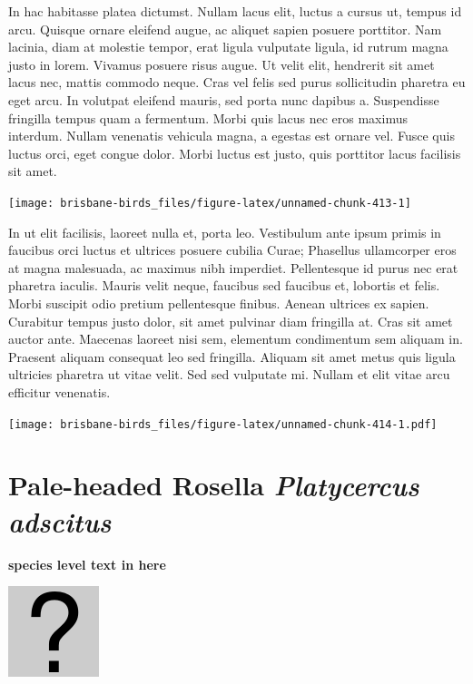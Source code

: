 \documentclass[]{book}
\let\origfigure\figure
\let\endorigfigure\endfigure
\renewenvironment{figure}[1][2] {
  \expandafter\origfigure\expandafter[H]
} {
  \endorigfigure
}
\begin{document}
In hac habitasse platea dictumst. Nullam lacus elit, luctus a cursus ut,
tempus id arcu. Quisque ornare eleifend augue, ac aliquet sapien posuere
porttitor. Nam lacinia, diam at molestie tempor, erat ligula vulputate
ligula, id rutrum magna justo in lorem. Vivamus posuere risus augue. Ut
velit elit, hendrerit sit amet lacus nec, mattis commodo neque. Cras vel
felis sed purus sollicitudin pharetra eu eget arcu. In volutpat eleifend
mauris, sed porta nunc dapibus a. Suspendisse fringilla tempus quam a
fermentum. Morbi quis lacus nec eros maximus interdum. Nullam venenatis
vehicula magna, a egestas est ornare vel. Fusce quis luctus orci, eget
congue dolor. Morbi luctus est justo, quis porttitor lacus facilisis sit
amet.

\begin{figure}
\texttt{[image: brisbane-birds\_files/figure-latex/unnamed-chunk-413-1]} \caption{insert figure caption}\label{fig:unnamed-chunk-413}
\end{figure}

In ut elit facilisis, laoreet nulla et, porta leo. Vestibulum ante ipsum
primis in faucibus orci luctus et ultrices posuere cubilia Curae;
Phasellus ullamcorper eros at magna malesuada, ac maximus nibh
imperdiet. Pellentesque id purus nec erat pharetra iaculis. Mauris velit
neque, faucibus sed faucibus et, lobortis et felis. Morbi suscipit odio
pretium pellentesque finibus. Aenean ultrices ex sapien. Curabitur
tempus justo dolor, sit amet pulvinar diam fringilla at. Cras sit amet
auctor ante. Maecenas laoreet nisi sem, elementum condimentum sem
aliquam in. Praesent aliquam consequat leo sed fringilla. Aliquam sit
amet metus quis ligula ultricies pharetra ut vitae velit. Sed sed
vulputate mi. Nullam et elit vitae arcu efficitur venenatis.

\begin{figure}
\centering
\texttt{[image: brisbane-birds\_files/figure-latex/unnamed-chunk-414-1.pdf]}
\caption{\label{fig:unnamed-chunk-414}insert figure caption}
\end{figure}

\section{\texorpdfstring{Pale-headed Rosella \emph{Platycercus
adscitus}}{Pale-headed Rosella Platycercus adscitus}}\label{pale-headed-rosella-platycercus-adscitus}

\textbf{species level text in here}

\begin{figure}
\centering
\includegraphics{assets/missing.png}
\caption{No image for species}
\end{figure}
\end{document}
